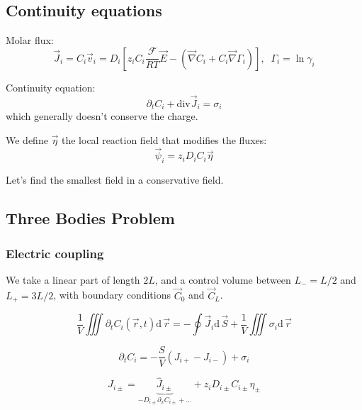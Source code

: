 \documentclass[aps,12pt]{revtex4}
\begin{document}
\subsection{Continuity equations}

Molar flux:
\begin{equation}
	\vec{J}_i = C_i \vec{v}_i = D_i \left[z_i C_i  \dfrac{\mathcal{F}}{RT} \vec{E} - \left(\vec{\nabla} C_i + C_i \vec{\nabla}\Gamma_i\right) \right],\;\;\Gamma_i = \ln \gamma_i
\end{equation}

Continuity equation:
\begin{equation}
	\partial_t C_i + \mathrm{div} \vec{J}_i = \sigma_i
\end{equation}
which generally doesn't conserve the charge.

We define $\vec \eta$ the local reaction field that modifies the fluxes:
\begin{equation}
	\vec \psi_i = z_i D_i C_i \vec \eta
\end{equation}

Let's find the smallest field in a conservative field.

\subsection{Three Bodies Problem}

\subsubsection{Electric coupling}
We take a linear part of length $2L$, and a control volume between $L_-=L/2$ and $L_+=3L/2$,
with boundary conditions $\vec C_0$ and $\vec C_L$.

\begin{equation}
	\dfrac{1}{V} \iiint \partial_t C_i(\vec r,t)  \mathrm{d}\, \vec r
	= - \oint  	\vec{J}_i \mathrm{d}\, \vec S + \dfrac{1}{V} \iiint \sigma_i \mathrm{d}\, \vec r
\end{equation}
 
\begin{equation}
	\partial_t C_i = -\dfrac{S}{V}(J_{i+}-J_{i-}) + \sigma_i
\end{equation}

\begin{equation}
	J_{i\pm} = \underbrace{\hat J_{i\pm}}_{-D_{i\pm} \partial_x C_{i\pm}+\ldots} + z_i D_{i\pm} C_{i\pm} \eta_\pm
\end{equation}
\end{document}
